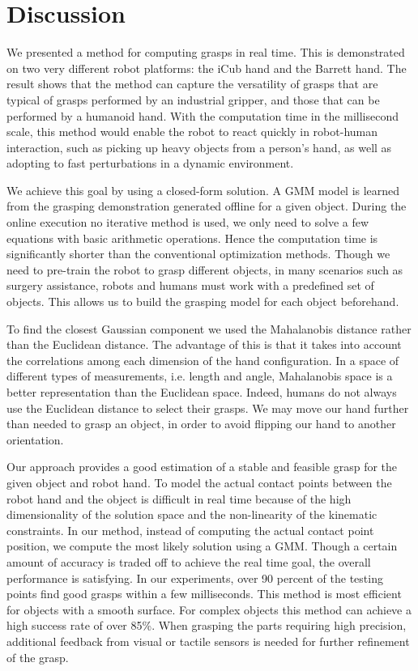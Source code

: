 \section{Discussion}
\label{cha3:sec6}

We presented a method for computing grasps in real time. This is demonstrated on two very different robot platforms: the iCub hand and the Barrett hand. The result shows that the method can capture the versatility of grasps that are typical of grasps performed by an industrial gripper, and those that can be performed by a humanoid hand.
With the computation time in the millisecond scale,
this method would enable the robot to react quickly in robot-human interaction, such as picking up heavy objects from a person's hand, as well as adopting to fast perturbations in a dynamic environment.

We achieve this goal by using a closed-form solution. A GMM model is learned from the grasping demonstration generated offline for a given object. During the online execution no iterative method is used, we only need to solve a few equations with basic arithmetic operations. Hence the computation time is significantly shorter than the conventional optimization methods. Though we need to pre-train the robot to grasp different objects, in many scenarios such as surgery assistance, robots and humans must work with a predefined set of objects. This allows us to build the grasping model for each object beforehand.


To find the closest Gaussian component we used the Mahalanobis distance rather than the Euclidean distance. The advantage of this is that it takes into account the correlations among each dimension of the hand configuration. In a space of different types of measurements, i.e. length and angle, Mahalanobis space is a better representation than the Euclidean space. Indeed, humans do not always use the Euclidean distance to select their grasps. We may move our hand further than needed to grasp an object, in order to avoid flipping our hand to another orientation.

Our approach provides a good estimation of a stable and feasible grasp for the given object and robot hand. To model the actual contact points between the robot hand and the object is difficult in real time because of the high dimensionality of the solution space and the non-linearity of the kinematic constraints. In our method, instead of computing the actual contact point position, we compute the most likely solution using a GMM. Though a certain amount of accuracy is traded off to achieve the real time goal, the overall performance is satisfying. In our experiments, over 90 percent of the testing points find good grasps within a few milliseconds. This method is most efficient for objects with a smooth surface. For complex objects this method can achieve a high success rate of over 85\%. When grasping the parts requiring high precision, additional feedback from visual or tactile sensors is needed for further refinement of the grasp.

